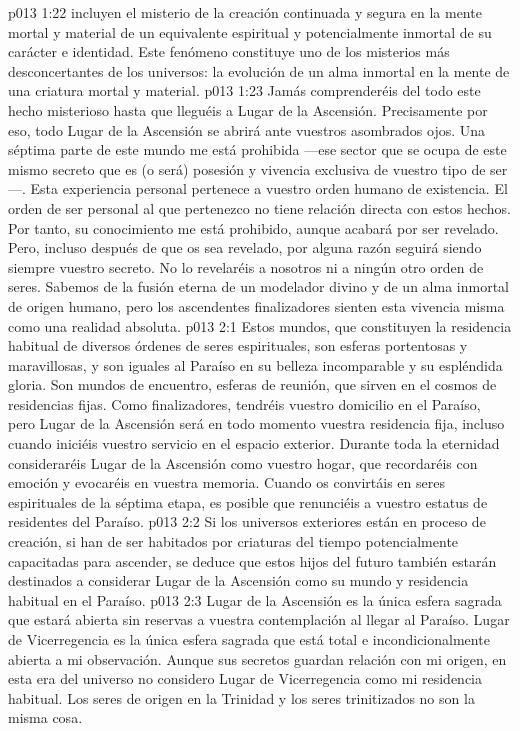 \vs p013 1:22 \pc {} incluyen el misterio de la creación continuada y segura en la mente mortal y material de un equivalente espiritual y potencialmente inmortal de su carácter e identidad. Este fenómeno constituye uno de los misterios más desconcertantes de los universos: la evolución de un alma inmortal en la mente de una criatura mortal y material.
\vs p013 1:23 Jamás comprenderéis del todo este hecho misterioso hasta que lleguéis a Lugar de la Ascensión. Precisamente por eso, todo Lugar de la Ascensión se abrirá ante vuestros asombrados ojos. Una séptima parte de este mundo me está prohibida ---ese sector que se ocupa de este mismo secreto que es (o será) posesión y vivencia exclusiva de vuestro tipo de ser---. Esta experiencia personal pertenece a vuestro orden humano de existencia. El orden de ser personal al que pertenezco no tiene relación directa con estos hechos. Por tanto, su conocimiento me está prohibido, aunque acabará por ser revelado. Pero, incluso después de que os sea revelado, por alguna razón seguirá siendo siempre vuestro secreto. No lo revelaréis a nosotros ni a ningún otro orden de seres. Sabemos de la fusión eterna de un modelador divino y de un alma inmortal de origen humano, pero los ascendentes finalizadores sienten esta vivencia misma como una realidad absoluta.
\vs p013 2:1 Estos mundos, que constituyen la residencia habitual de diversos órdenes de seres espirituales, son esferas portentosas y maravillosas, y son iguales al Paraíso en su belleza incomparable y su espléndida gloria. Son mundos de encuentro, esferas de reunión, que sirven en el cosmos de residencias fijas. Como finalizadores, tendréis vuestro domicilio en el Paraíso, pero Lugar de la Ascensión será en todo momento vuestra residencia fija, incluso cuando iniciéis vuestro servicio en el espacio exterior. Durante toda la eternidad consideraréis Lugar de la Ascensión como vuestro hogar, que recordaréis con emoción y evocaréis en vuestra memoria. Cuando os convirtáis en seres espirituales de la séptima etapa, es posible que renunciéis a vuestro estatus de residentes del Paraíso.
\vs p013 2:2 Si los universos exteriores están en proceso de creación, si han de ser habitados por criaturas del tiempo potencialmente capacitadas para ascender, se deduce que estos hijos del futuro también estarán destinados a considerar Lugar de la Ascensión como su mundo y residencia habitual en el Paraíso.
\vs p013 2:3 \pc Lugar de la Ascensión es la única esfera sagrada que estará abierta sin reservas a vuestra contemplación al llegar al Paraíso. Lugar de Vicerregencia es la única esfera sagrada que está total e incondicionalmente abierta a mi observación. Aunque sus secretos guardan relación con mi origen, en esta era del universo no considero Lugar de Vicerregencia como mi residencia habitual. Los seres de origen en la Trinidad y los seres trinitizados no son la misma cosa.

